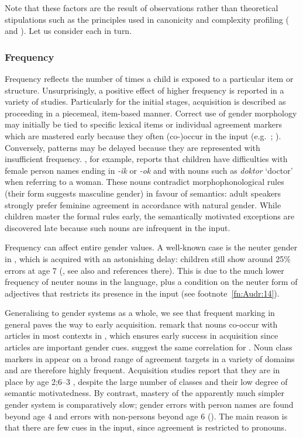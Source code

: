 \documentclass[output=collectionpaper]{langsci/langscibook}
\begin{document}
Note that these factors are the result of observations rather than theoretical stipulations such as the principles used in canonicity and complexity profiling ( and ). Let us consider each in turn.


\subsubsection{Frequency}

Frequency reflects the number of times a child is exposed to a particular item or structure. Unsurprisingly, a positive effect of higher frequency is reported in a variety of studies. Particularly for the initial stages, acquisition is described as proceeding in a piecemeal, item-based manner. Correct use of gender morphology may initially be tied to specific lexical items or individual agreement markers which are mastered early because they often (co-)occur in the input (e.g.\ \citealt{Mariscal2009,Szagun2007}; \citealt[115]{Mills1986}). Conversely, patterns may be delayed because they are represented with insufficient frequency. \citet{Rodina2014}, for example, reports that  children have difficulties with female person names ending in \textit{-ik} or \textit{-ok} and with nouns such as \textit{doktor} `doctor' when referring to a woman. These nouns contradict morphophonological rules (their form suggests masculine gender) in favour of semantics: adult speakers strongly prefer feminine agreement in accordance with natural gender. While children master the formal rules early, the semantically motivated exceptions are discovered late because such nouns are infrequent in the input.

Frequency can affect entire gender values. A well-known case is the neuter gender in , which is acquired with an astonishing delay: children still show around 25\% errors at age 7 (\citealt{Blom2008}, see also \citealt{Keij2012} and references there). This is due to the much lower frequency of neuter nouns in the language, plus a condition on the neuter form of adjectives that restricts its presence in the input (see footnote~\ref{fn:Audr:14}).

Generalising to gender systems as a whole, we see that frequent marking in general paves the way to early acquisition. \citet{Szagun2007} remark that nouns co-occur with articles in most contexts in , which ensures early success in acquisition since articles are important gender cues. \citet{Eichler2013} suggest the same correlation for . Noun class markers in  appear on a broad range of agreement targets in a variety of domains and are therefore highly frequent. Acquisition studies report that they are in place by age 2;6--3 \citep{Demuth2003}, despite the large number of classes and their low degree of semantic motivatedness. By contrast, mastery of the apparently much simpler  gender system is comparatively slow; gender errors with person names are found beyond age 4 and errors with non-persons beyond age 6 (\citealt[91, 103]{Mills1986}). The main reason is that there are few cues in the input, since agreement is restricted to pronouns.
\end{document}
